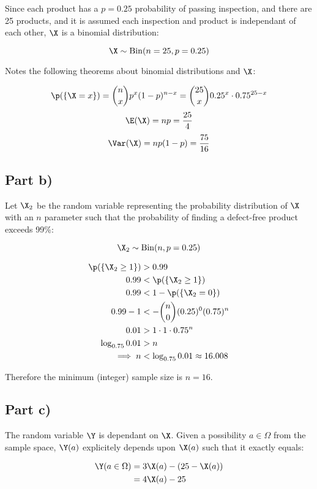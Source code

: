 Since each product has a $p = 0.25$ probability of passing inspection, and there are 25 products, and it is assumed each inspection and product is independant of each other, $\X$ is a binomial distribution:

\[
\X \sim \mathrm{Bin}(n = 25, p = 0.25)
\]

Notes the following theorems about binomial distributions and $\X$:

\[
\p(\{ \X = x \}) = {n \choose x}p^x (1-p)^{n - x} = {25 \choose x}0.25^x \cdot 0.75^{25 - x}
\]
\[
\E(\X) = np = \frac{25}{4}
\]
\[
\Var(\X) = np(1-p) = \frac{75}{16}
\]

\subsection{Part b)}

Let $\X_2$ be the random variable representing the probability distribution of $\X$ with an $n$ parameter
such that the probability of finding a defect-free product exceeds 99\%:


\[
\X_2 \sim \mathrm{Bin}(n, p = 0.25)
\]

\begin{align*}
\p(\{\X_2 \geq 1\}) &> 0.99 \\
0.99 &< \p(\{ \X_2 \geq 1 \}) \\
0.99 &< 1 - \p(\{ \X_2 = 0 \}) \\
0.99 - 1 &< - {n \choose 0}(0.25)^0(0.75)^n \\
0.01 &> 1 \cdot 1 \cdot 0.75^n \\
\log _{0.75} 0.01 &> n \\
\implies n &< \log _{0.75} 0.01 \approx 16.008
\end{align*}

Therefore the minimum (integer) sample size is $n = 16$.

\subsection{Part c)}

The random variable $\Y$ is dependant on $\X$.
Given a possibility $a \in \Omega$ from the sample space, $\Y(a)$ explicitely depends upon $\X(a)$ such that it exactly equals:

\begin{align*}
\Y(a \in \Omega) &= 3\X(a) - (25 - \X(a)) \\
&= 4\X(a) - 25
\end{align*}

